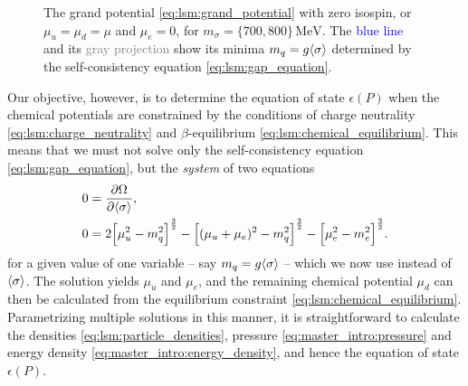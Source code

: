 \begin{figure}[t]
\caption{\label{fig:lsm:grand-potential-noisospin}%
	The grand potential \eqref{eq:lsm:grand_potential} with zero isospin, or $\mu_u = \mu_d = \mu$ and $\mu_e=0$, for $m_\sigma=\{700,800\} \, \si{\mega\electronvolt}$.
	The \textcolor{blue}{blue line} and its \textcolor{gray}{gray projection} show its minima $m_q = g \langle \sigma \rangle$ determined by the self-consistency equation \eqref{eq:lsm:gap_equation}.
}
\end{figure}

Our objective, however, is to determine the equation of state $\epsilon(P)$
when the chemical potentials are constrained by the conditions of charge neutrality \eqref{eq:lsm:charge_neutrality}
and $\beta$-equilibrium \eqref{eq:lsm:chemical_equilibrium}.
This means that we must not solve only the self-consistency equation \eqref{eq:lsm:gap_equation},
but the \emph{system} of two equations
\begin{subequations}
\begin{align}
	0 &= \pdv{\Omega}{ \langle \sigma \rangle} , \label{eq:lsm:minsys_min} \\
	0 &= 2 \Big[\mu_u^2-m_q^2\Big]^\frac32 - \Big[(\mu_u+\mu_e)^2-m_q^2\Big]^\frac32 - \Big[\mu_e^2-m_e^2\Big]^\frac32 \label{eq:lsm:minsys_charge}.
\end{align}%
\label{eq:lsm:minsys}%
\end{subequations}%
for a given value of one variable -- say $m_q=g \langle \sigma \rangle$ -- which we now use instead of $\langle \sigma \rangle$.
The solution yields $\mu_u$ and $\mu_e$, and the remaining chemical potential $\mu_d$ can then be calculated from the equilibrium constraint \eqref{eq:lsm:chemical_equilibrium}.
Parametrizing multiple solutions in this manner, it is straightforward to calculate the densities \eqref{eq:lsm:particle_densities}, pressure \eqref{eq:master_intro:pressure} and energy density \eqref{eq:master_intro:energy_density},
and hence the equation of state $\epsilon(P)$.

